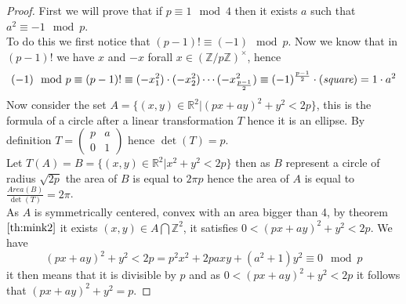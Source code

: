 \documentclass[a4paper,11pt,american]{article}
\newcommand{\R}{\mathbb{R}}
\newcommand{\Z}{\mathbb{Z}}
\theoremstyle{plain}
\theoremstyle{definition}
\begin{document}
\begin{proof}
    First we will prove that if $p\equiv 1\mod 4$ then it exists $a$ such that $a^2\equiv -1 \mod p$.\\
    To do this we first notice that $(p-1)!\equiv (-1)\mod p$. Now 
    we know that in $(p-1)!$ we have $x$ and $-x$ forall $x\in (\Z/p\Z)^{\times}$, hence $$(-1)\mod p\equiv(p-1)!\equiv (-x_1^2)\cdot(-x_2^2)\cdots(-x^2_{\frac{p-1}{2}})\equiv (-1)^{\frac{p-1}{2}}\cdot(\emph{square})=1\cdot a^2$$
    Now consider the set $A=\{(x,y)\in\R^2\vert(px+ay)^2+y^2<2p\}$, this is the formula of a circle after a linear transformation $T$ hence it is an ellipse. By definition $T=\begin{pmatrix}
        p & a  \\
        0 & 1  
      \end{pmatrix} $ hence $\det(T)=p$.\\
      Let $T(A)=B=\{(x,y)\in\R^2\vert x^2+y^2<2p\}$ then as $B$ represent a circle of radius $\sqrt{2p}$ the area of $B$ is equal to $2\pi p$ hence the area of $A$ is equal to $\frac{Area(B)}{\det(T)}=2\pi$.\\
      As $A$ is symmetrically centered, convex with an area bigger than 4, by theorem $\eqref{th:mink2}$ it exists $(x,y)\in A\bigcap\Z^2$, it satisfies $0<(px+ay)^2+y^2<2p$.
      We have $$(px+ay)^2+y^2<2p=p^2x^2+2paxy+(a^2+1)y^2\equiv0\mod p$$ it then means that it is divisible by $p$ and as $0<(px+ay)^2+y^2<2p$ it follows that $(px+ay)^2+y^2=p$.
\end{proof}
\end{document}
